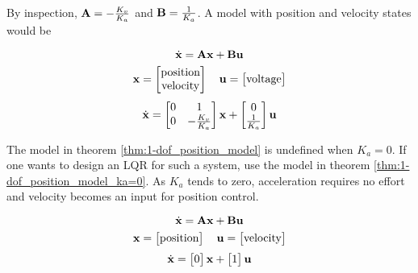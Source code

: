 By inspection, $\mathbf{A} = -\frac{K_v}{K_a}$ and $\mathbf{B} = \frac{1}{K_a}$. A
model with position and velocity states would be
\begin{theorem}
  \label{thm:1-dof_position_model}
  \begin{equation*}
    \dot{\mathbf{x}} = \mathbf{A}\mathbf{x} + \mathbf{B}\mathbf{u}
  \end{equation*}
  \begin{equation*}
    \mathbf{x} =
    \begin{bmatrix}
      \text{position} \\
      \text{velocity}
    \end{bmatrix}
    \quad
    \mathbf{u} =
    \begin{bmatrix}
      \text{voltage}
    \end{bmatrix}
  \end{equation*}
  \begin{equation}
    \dot{\mathbf{x}} =
    \begin{bmatrix}
      0 & 1 \\
      0 & -\frac{K_v}{K_a}
    \end{bmatrix}
    \mathbf{x} +
    \begin{bmatrix}
      0 \\
      \frac{1}{K_a}
    \end{bmatrix}
    \mathbf{u}
  \end{equation}
\end{theorem}

The model in theorem \ref{thm:1-dof_position_model} is undefined when $K_a = 0$.
If one wants to design an LQR for such a system, use the model in theorem
\ref{thm:1-dof_position_model_ka=0}. As $K_a$ tends to zero, acceleration
requires no effort and velocity becomes an input for position control.
\begin{theorem}[1-DOF mechanism position model ($K_a = 0$)]
  \label{thm:1-dof_position_model_ka=0}
  \begin{equation*}
    \dot{\mathbf{x}} = \mathbf{A}\mathbf{x} + \mathbf{B}\mathbf{u}
  \end{equation*}
  \begin{equation*}
    \mathbf{x} =
    \begin{bmatrix}
      \text{position}
    \end{bmatrix}
    \quad
    \mathbf{u} =
    \begin{bmatrix}
      \text{velocity}
    \end{bmatrix}
  \end{equation*}
  \begin{equation}
    \dot{\mathbf{x}} =
    \begin{bmatrix}
      0
    \end{bmatrix}
    \mathbf{x} +
    \begin{bmatrix}
      1
    \end{bmatrix}
    \mathbf{u}
  \end{equation}
\end{theorem}
